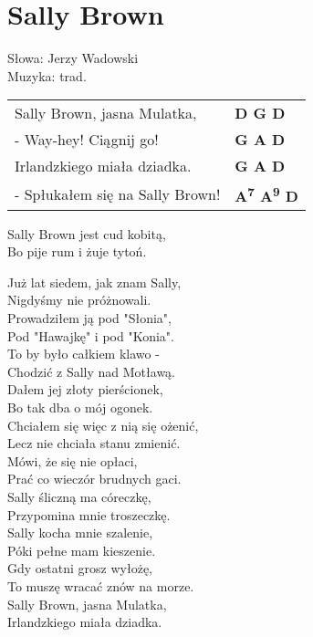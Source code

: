 \section{Sally Brown}

Słowa: Jerzy Wadowski\\
Muzyka:  trad.

\vspace{2em}
\begin{tabular}{@{}p{7cm}@{}l@{}}
Sally Brown, jasna Mulatka, & \bfseries  D G D\\
- Way-hey! Ciągnij go! & \bfseries  G A D\\
Irlandzkiego miała dziadka. & \bfseries  G A D\\
- Spłukałem się na Sally Brown! & \bfseries  A\textsuperscript{7} A\textsuperscript{9} D\\
\end{tabular}

\vspace{1em}
Sally Brown jest cud kobitą, \\
Bo pije rum i żuje tytoń. \\

\begin{multicols}{2}
Już lat siedem, jak znam Sally, \\
Nigdyśmy nie próżnowali. \\

Prowadziłem ją pod "Słonia", \\
Pod "Hawajkę" i pod "Konia". \\

To by było całkiem klawo - \\
Chodzić z Sally nad Motławą. \\

Dałem jej złoty pierścionek, \\
Bo tak dba o mój ogonek. \\

Chciałem się więc z nią się ożenić, \\
Lecz nie chciała stanu zmienić. \\

Mówi, że się nie opłaci, \\
Prać co wieczór brudnych gaci. \\

Sally śliczną ma córeczkę, \\
Przypomina mnie troszeczkę. \\

Sally kocha mnie szalenie, \\
Póki pełne mam kieszenie. \\

Gdy ostatni grosz wyłożę, \\
To muszę wracać znów na morze. \\

Sally Brown, jasna Mulatka, \\
Irlandzkiego miała dziadka.
\end{multicols}
